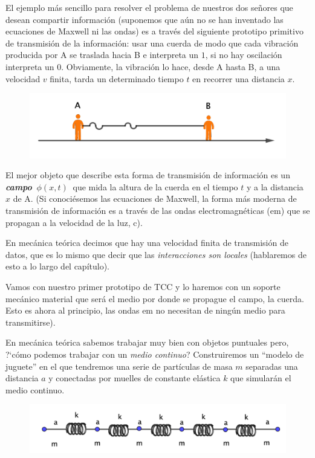 El ejemplo más sencillo para resolver el problema de nuestros dos señores que desean compartir información (suponemos que aún no se han inventado las ecuaciones de Maxwell ni las ondas) es a través del siguiente prototipo primitivo de transmisión de la información: usar una cuerda de modo que cada vibración producida por A se traslada hacia B e interpreta un $1$, si no hay oscilación interpreta un $0$. Obviamente, la vibración lo hace, desde A hasta B, a una velocidad $v$ finita, tarda un determinado tiempo $t$ en recorrer una distancia $x$.

\begin{figure}[H]
	\centering
	\includegraphics[width=.75\textwidth]{imagenes/img28-02.png}
\end{figure}

El mejor objeto que describe esta forma de transmisión de información es un \textbf{\emph{campo}} $\ \phi(x,t) \ $ que mida la altura de la cuerda en el tiempo $t$ y a la distancia $x$ de A. \textcolor{gris}{(Si conociésemos las ecuaciones de Maxwell, la forma más moderna de transmisión de información es a través de las ondas electromagnéticas (em) que se propagan a la velocidad de la luz, c)}.


En mecánica teórica decimos que hay una velocidad finita de transmisión de datos, que es lo mismo que decir que las \emph{interacciones son locales} (hablaremos de esto a lo largo del capítulo).

Vamos con nuestro primer prototipo de TCC y lo haremos con un soporte mecánico material que será el medio por donde se propague el campo, la cuerda. Esto es ahora al principio, las ondas em no necesitan de ningún medio para transmitirse).

En mecánica teórica sabemos trabajar muy bien con objetos puntuales pero, ?`cómo podemos trabajar con un \emph{medio continuo}? Construiremos un ``modelo de juguete'' en el que tendremos una serie de partículas de masa $m$ separadas una distancia $a$ y conectadas por muelles de constante elástica $k$ que simularán el medio continuo.


\begin{figure}[H]
	\centering
	\includegraphics[width=.75\textwidth]{imagenes/img28-03.png}
\end{figure}


